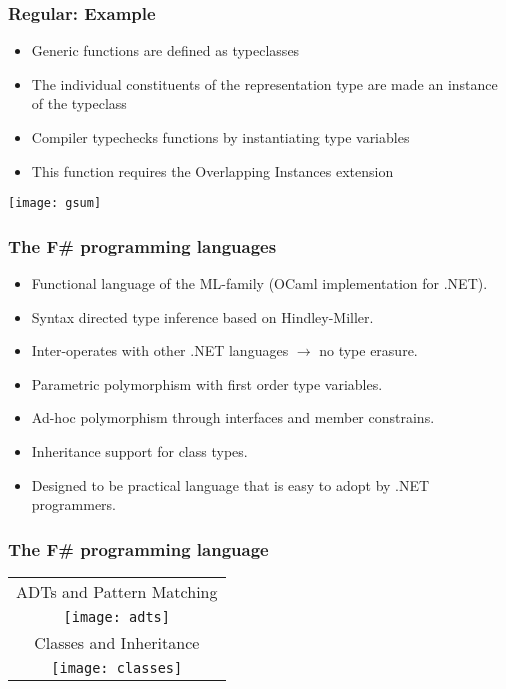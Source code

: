 \documentclass{beamer}
\begin{document}
\begin{frame}

  \frametitle{Regular: Example}


  \begin{multicols}{2}
    \begin{itemize}
    \item Generic functions are defined as typeclasses
    \item The individual constituents of the representation type are
      made an instance of the typeclass
    \item Compiler typechecks functions by instantiating type
      variables
    \item This function requires the Overlapping Instances extension
    \end{itemize}
    \pagebreak
    \texttt{[image: gsum]}
  \end{multicols}
  
\end{frame}

\begin{frame}

  \frametitle{The F\# programming languages}

  \begin{itemize}
  \item Functional language of the ML-family (OCaml implementation for .NET).
  \item Syntax directed type inference based on Hindley-Miller.
  \item Inter-operates with other .NET languages $\rightarrow$ no type erasure.
  \item Parametric polymorphism with first order type variables.
  \item Ad-hoc polymorphism through interfaces and member constrains.
  \item Inheritance support for class types.
  \item Designed to be practical language that is easy to adopt by
    .NET programmers.
  \end{itemize}
\end{frame}

\begin{frame}

  \frametitle{The F\# programming language}
  
  \begin{tabular}{c}
    ADTs and Pattern Matching \\
    \texttt{[image: adts]} \\
    Classes and Inheritance \\
    \texttt{[image: classes]} \\
  \end{tabular}
  
\end{frame}
\end{document}
